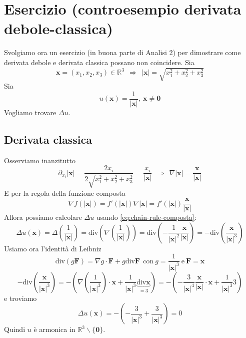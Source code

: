 \documentclass[10pt,a4paper,twoside,openright]{book}
\newcommand{\x}{\mathbf{x}}
\newcommand{\zer}{\mathbf{0}}
\begin{document}
\section{Esercizio (controesempio derivata debole-classica)}
\label{sec:controesempio-derivata-debole-classica}

Svolgiamo ora un esercizio (in buona parte di Analisi 2) per dimostrare come derivata debole e derivata classica possano non coincidere. Sia
\begin{equation*}
	\x =(x_{1} ,x_{2} ,x_{3}) \in \mathbb{R}^{3} \ \ \Rightarrow \ \ | \x| =\sqrt{x^{2}_{1} +x^{2}_{2} +x^{2}_{3}}
\end{equation*}
Sia 
\begin{equation*}
	u(\x) =\frac{1}{| \x| } ,\ \x \neq \zer
\end{equation*}
Vogliamo trovare $\displaystyle \Delta u$.

\subsection{Derivata classica}

Osserviamo inanzitutto 
\begin{equation*}
	\partial _{x_{i}}| \x| =\frac{2x_{i}}{2\sqrt{x_{1}^{2} +x_{2}^{2} +x_{3}^{2}}} =\frac{x_{i}}{|\x| } \ \ \Rightarrow \ \ \nabla | \x| =\frac{\x}{| \x| }
\end{equation*}
E per la regola della funzione composta
\begin{equation}
	\nabla f(| \x|) =f'(| \x|) \nabla | \x| =f'(| \x|)\frac{\x}{| \x| }
	\label{eq:chain-rule-composta}
\end{equation}
Allora possiamo calcolare $\displaystyle \Delta u$ usando \eqref{eq:chain-rule-composta}:
\begin{equation*}
	\Delta u(\x) =\Delta \left(\frac{1}{| \x| }\right) =\mathrm{div}\left(\nabla \left(\frac{1}{| \x| }\right)\right) =\mathrm{div}\left(-\frac{1}{| \x| ^{2}}\frac{\x}{| \x| }\right) =-\mathrm{div}\left(\frac{\x}{| \x| ^{3}}\right)
\end{equation*}
Usiamo ora l'identità di Leibniz 
\begin{equation*}
	\mathrm{div}(g\mathbf{F}) =\nabla g\cdotp \mathbf{F} +g\mathrm{div}\mathbf{F} \ \ \text{con} \ g=\frac{1}{| \x| ^{3}} \ \text{e} \ \mathbf{F} =\x
\end{equation*}
\begin{equation*}
	-\mathrm{div}\left(\frac{\x}{| \x| ^{3}}\right) =-\left(\nabla \left(\frac{1}{| \x| ^{3}}\right) \cdotp \x +\frac{1}{| \x| ^{3}}\underbrace{\mathrm{div}\x}_{=3}\right) =-\left(-\frac{3}{| \x| ^{4}}\frac{\x}{| \x| } \cdotp \x +\frac{1}{| \x| ^{3}} 3\right)
\end{equation*}
e troviamo
\begin{equation*}
	\Delta u(\x) =-\left(-\frac{3}{| \x| ^{3}} +\frac{3}{| \x| ^{3}}\right) =0
\end{equation*}
Quindi $u$ è armonica in $\displaystyle \mathbb{R}^{3} \backslash \{\zer\}$.
\end{document}
